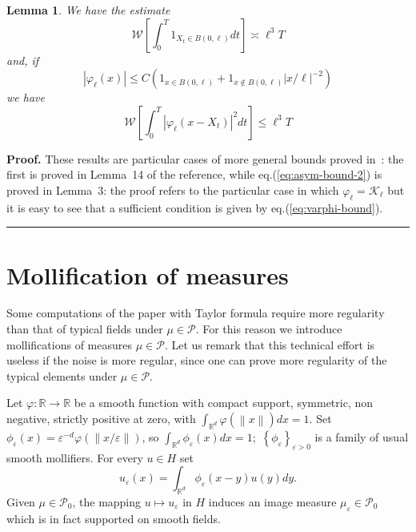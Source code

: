 \documentclass[11pt]{preprint}
\newtheorem{lemma}[theorem]{Lemma}
\newenvironment{proof}[1][Proof]{\textbf{#1.} }{\ \rule{0.5em}{0.5em}}
\begin{document}
\begin{lemma}
\label{lemma:wiener-bounds} We have the estimate
\begin{equation}
\mathcal{W}\left[  \int_{0}^{T}1_{X_{t}\in B(0,\ell)}dt\right]  \asymp\ell
^{3}T\label{eq:asymp-bound-1}%
\end{equation}
and, if
\begin{equation}
|\varphi_{\ell}(x)|\leq C(1_{x\in B(0,\ell)}+1_{x\not \in B(0,\ell)}%
|x/\ell|^{-2})\label{eq:varphi-bound}%
\end{equation}
we have
\begin{equation}
\mathcal{W}\left[  \int_{0}^{T}|\varphi_{\ell}(x-X_{t})|^{2}dt\right]
\leq\ell^{3}T\label{eq:asym-bound-2}%
\end{equation}
\end{lemma}

\begin{proof}
These results are particular cases of more general bounds proved
in~\cite{FlaGub}: the first is proved in Lemma~14 of the reference, while
eq.(\ref{eq:asym-bound-2}) is proved in Lemma~3: the proof refers to the
particular case in which $\varphi_{\ell}=\mathcal{K}_{\ell}$ but it is easy to see that
a sufficient condition is given by eq.(\ref{eq:varphi-bound}).
\end{proof}

\appendix
\section{Mollification of measures}

Some computations of the paper with Taylor formula require more regularity
than that of typical fields under $\mu\in\mathcal{P}$. For this reason we
introduce mollifications of measures $\mu\in\mathcal{P}$. Let us remark that
this technical effort is useless if the noise is more regular, since one can
prove more regularity of the typical elements under $\mu\in\mathcal{P}$.

Let $\varphi:\mathbb{R}\rightarrow\mathbb{R}$ be a smooth function with
compact support, symmetric, non negative, strictly positive at zero, with
$\int_{\mathbb{R}^{d}}\varphi\left(  \left\|  x\right\|  \right)  dx=1$. Set
$\phi_{\varepsilon}\left(  x\right)  = \varepsilon^{-d}\varphi\left(
\left\|  x/\varepsilon\right\|  \right)  $, so $\int_{\mathbb{R}^{d}%
}\phi_{\varepsilon}\left(  x\right)  dx=1$;\ $\left\{  \phi_{\varepsilon
}\right\}  _{\varepsilon>0}$ is a family of usual smooth mollifiers. For every
$u\in H$ set
\[
u_{\varepsilon}\left(  x\right)  =\int_{\mathbb{R}^{d}}\phi_{\varepsilon
}\left(  x-y\right)  u\left(  y\right)  dy.
\]
Given $\mu\in\mathcal{P}_{0}$, the mapping $u\mapsto u_{\varepsilon}$ in $H$
induces an image measure $\mu_{\varepsilon}\in\mathcal{P}_{0}$ which is in
fact supported on smooth fields.
\end{document}
